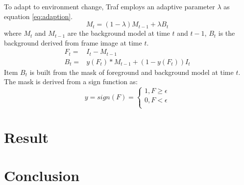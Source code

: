 \documentclass[draftclsnofoot,onecolumn]{IEEEtran}
\begin{document}
	To adapt to environment change, Traf employs an adaptive parameter $\lambda$ as equation \ref{eq:adaption}.
	\begin{equation}
	M_{t} = (1-\lambda)M_{t-1} + \lambda B_{t}
	\label{eq:adaption}
	\end{equation}
	where $M_t$ and $M_{t-1}$ are the background model at time $t$ and $t-1$, $B_{t}$ is the background derived from frame image at time $t$.
	\begin{eqnarray}	
	F_{t}=&I_{t} - M_{t-1}	\\
	B_{t}=&y(F_{t})*M_{t-1}+(1-y(F_{t}))I_{t}
	\end{eqnarray}
Item $B_{t}$ is built from the mask of foreground and background model at time $t$. The mask is derived from a sign function as:
	\begin{equation}
	  y=sign(F)=\left\{
	   \begin{aligned}
	   	1, F \geq \epsilon \\
	   	0, F < \epsilon \\
	   \end{aligned}
	   \right.
	\end{equation}			

	

\section{Result}



\section{Conclusion}



\end{document}
